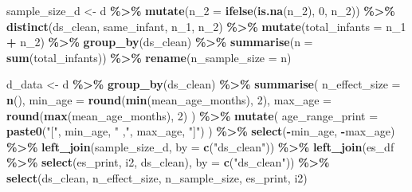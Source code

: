 \documentclass[
]{article}
\newenvironment{Shaded}{\begin{snugshade}}{\end{snugshade}}
\newcommand{\AttributeTok}[1]{\textcolor[rgb]{0.13,0.29,0.53}{#1}}
\newcommand{\DecValTok}[1]{\textcolor[rgb]{0.00,0.00,0.81}{#1}}
\newcommand{\FunctionTok}[1]{\textcolor[rgb]{0.13,0.29,0.53}{\textbf{#1}}}
\newcommand{\NormalTok}[1]{#1}
\newcommand{\OtherTok}[1]{\textcolor[rgb]{0.56,0.35,0.01}{#1}}
\newcommand{\SpecialCharTok}[1]{\textcolor[rgb]{0.81,0.36,0.00}{\textbf{#1}}}
\newcommand{\StringTok}[1]{\textcolor[rgb]{0.31,0.60,0.02}{#1}}
\begin{document}
\begin{Shaded}
\begin{Highlighting}[]
\NormalTok{sample\_size\_d }\OtherTok{\textless{}{-}}\NormalTok{ d }\SpecialCharTok{\%\textgreater{}\%} 
  \FunctionTok{mutate}\NormalTok{(}\AttributeTok{n\_2 =} \FunctionTok{ifelse}\NormalTok{(}\FunctionTok{is.na}\NormalTok{(n\_2), }\DecValTok{0}\NormalTok{, n\_2)) }\SpecialCharTok{\%\textgreater{}\%} 
  \FunctionTok{distinct}\NormalTok{(ds\_clean, same\_infant, n\_1, n\_2) }\SpecialCharTok{\%\textgreater{}\%} 
  \FunctionTok{mutate}\NormalTok{(}\AttributeTok{total\_infants =}\NormalTok{ n\_1 }\SpecialCharTok{+}\NormalTok{ n\_2) }\SpecialCharTok{\%\textgreater{}\%} 
  \FunctionTok{group\_by}\NormalTok{(ds\_clean) }\SpecialCharTok{\%\textgreater{}\%} 
  \FunctionTok{summarise}\NormalTok{(}\AttributeTok{n =} \FunctionTok{sum}\NormalTok{(total\_infants)) }\SpecialCharTok{\%\textgreater{}\%} 
  \FunctionTok{rename}\NormalTok{(}\AttributeTok{n\_sample\_size =}\NormalTok{ n)}

\NormalTok{d\_data }\OtherTok{\textless{}{-}}\NormalTok{ d }\SpecialCharTok{\%\textgreater{}\%} 
  \FunctionTok{group\_by}\NormalTok{(ds\_clean) }\SpecialCharTok{\%\textgreater{}\%} 
  \FunctionTok{summarise}\NormalTok{(}
    \AttributeTok{n\_effect\_size =} \FunctionTok{n}\NormalTok{(), }
    \AttributeTok{min\_age =} \FunctionTok{round}\NormalTok{(}\FunctionTok{min}\NormalTok{(mean\_age\_months), }\DecValTok{2}\NormalTok{), }
    \AttributeTok{max\_age =} \FunctionTok{round}\NormalTok{(}\FunctionTok{max}\NormalTok{(mean\_age\_months), }\DecValTok{2}\NormalTok{)}
\NormalTok{  ) }\SpecialCharTok{\%\textgreater{}\%} 
  \FunctionTok{mutate}\NormalTok{(}
    \AttributeTok{age\_range\_print =} \FunctionTok{paste0}\NormalTok{(}\StringTok{"["}\NormalTok{, min\_age, }\StringTok{" ,"}\NormalTok{, max\_age, }\StringTok{"]"}\NormalTok{)}
\NormalTok{  ) }\SpecialCharTok{\%\textgreater{}\%} 
  \FunctionTok{select}\NormalTok{(}\SpecialCharTok{{-}}\NormalTok{min\_age, }\SpecialCharTok{{-}}\NormalTok{max\_age) }\SpecialCharTok{\%\textgreater{}\%} 
  \FunctionTok{left\_join}\NormalTok{(sample\_size\_d, }\AttributeTok{by =} \FunctionTok{c}\NormalTok{(}\StringTok{"ds\_clean"}\NormalTok{)) }\SpecialCharTok{\%\textgreater{}\%} 
  \FunctionTok{left\_join}\NormalTok{(es\_df }\SpecialCharTok{\%\textgreater{}\%} \FunctionTok{select}\NormalTok{(es\_print, i2, ds\_clean), }\AttributeTok{by =} \FunctionTok{c}\NormalTok{(}\StringTok{"ds\_clean"}\NormalTok{)) }\SpecialCharTok{\%\textgreater{}\%} 
  \FunctionTok{select}\NormalTok{(ds\_clean, n\_effect\_size, n\_sample\_size, es\_print, i2)}


\end{Highlighting}
\end{Shaded}
\end{document}
